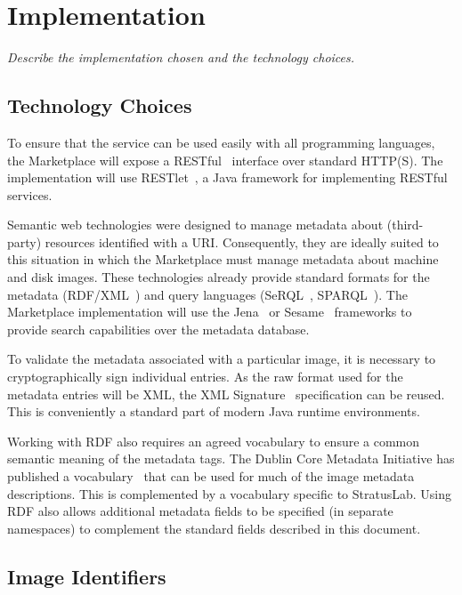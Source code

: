 \section{Implementation}
\label{sec:implementation}

{\em Describe the implementation chosen and the technology choices.}

\subsection{Technology Choices}

To ensure that the service can be used easily with all programming
languages, the Marketplace will expose a RESTful~\cite{rest} interface
over standard HTTP(S).  The implementation will use
RESTlet~\cite{restlet}, a Java framework for implementing RESTful
services.

Semantic web technologies were designed to manage metadata about
(third-party) resources identified with a URI.  Consequently, they are
ideally suited to this situation in which the Marketplace must manage
metadata about machine and disk images.  These technologies already
provide standard formats for the metadata (RDF/XML~\cite{rdfxml,
  rdfprimer, rdfschema}) and query languages (SeRQL~\cite{serql},
SPARQL~\cite{sparql}).  The Marketplace implementation will use the
Jena~\cite{jena} or Sesame~\cite{sesame} frameworks to provide search
capabilities over the metadata database.

To validate the metadata associated with a particular image, it is
necessary to cryptographically sign individual entries.  As the raw
format used for the metadata entries will be XML, the XML
Signature~\cite{xmlsig} specification can be reused.  This is
conveniently a standard part of modern Java runtime environments.

Working with RDF also requires an agreed vocabulary to ensure a common
semantic meaning of the metadata tags.  The Dublin Core Metadata
Initiative has published a vocabulary~\cite{dcterms} that can be used
for much of the image metadata descriptions.  This is complemented by
a vocabulary specific to StratusLab.  Using RDF also allows additional
metadata fields to be specified (in separate namespaces) to complement
the standard fields described in this document.

\subsection{Image Identifiers}

